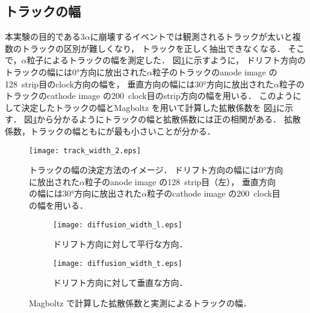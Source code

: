 \documentclass[../master]{subfiles}
\begin{document}
\subsection{トラックの幅}
本実験の目的である3$\alpha$に崩壊するイベントでは観測されるトラックが太いと複数のトラックの区別が難しくなり，
トラックを正しく抽出できなくなる．
そこで，$\alpha$粒子によるトラックの幅を測定した．
図\ref{fig::track_width}に示すように，
ドリフト方向のトラックの幅には\ang{0}方向に放出された$\alpha$粒子のトラックのanode image の128~strip目のclock方向の幅を，
垂直方向の幅には\ang{30}方向に放出された$\alpha$粒子のトラックのcathode image の200~clock目のstrip方向の幅を用いる．
このようにして決定したトラックの幅とMagboltz を用いて計算した拡散係数を%
図\ref{fig::diffusion_compare}に示す．
図\ref{fig::diffusion_compare}から分かるようにトラックの幅と拡散係数には正の相関がある．
拡散係数，トラックの幅ともに\isoButaneHydro が最も小さいことが分かる．
\begin{figure}
  \centering
  \texttt{[image: track\_width\_2.eps]}
  \caption{トラックの幅の決定方法のイメージ．
    ドリフト方向の幅には\ang{0}方向に放出された$\alpha$粒子のanode image の128~strip目（左），
    垂直方向の幅には\ang{30}方向に放出された$\alpha$粒子のcathode image の200~clock目の幅を用いる．}
  \label{fig::track_width}
\end{figure}

\begin{figure}
  \centering
  \begin{subfigure}{0.8\columnwidth}
    \centering
    \texttt{[image: diffusion\_width\_l.eps]}
    \caption{ドリフト方向に対して平行な方向．}
    \label{fig::diffusion_compare_l}
  \end{subfigure}
  \begin{subfigure}{0.8\columnwidth}
    \centering
    \texttt{[image: diffusion\_width\_t.eps]}
    \caption{ドリフト方向に対して垂直な方向．}
    \label{fig::diffusion_compare_t}
  \end{subfigure}
  \caption{Magboltz で計算した拡散係数と実測によるトラックの幅．}
  \label{fig::diffusion_compare}
\end{figure}
\end{document}
